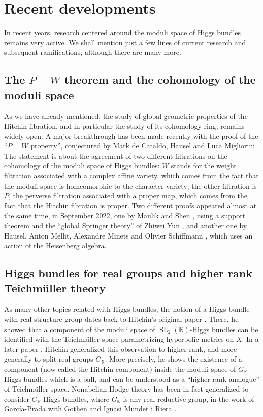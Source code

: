 \documentclass[12pt,a4paper]{amsbook}
\theoremstyle{remark} \newtheorem{rmk}[thm]{Remark}
\theoremstyle{definition} \newtheorem{defn}[thm]{Definition}
\theoremstyle{definition} \newtheorem{ex}[thm]{Example}
\theoremstyle{definition} \newtheorem{ej}{Exercise}
\newcommand{\bbR}{\mathbb R}
\DeclareMathOperator{\SL}{SL}
\begin{document}
\section{Recent developments}
In recent years, research centered around the moduli space of Higgs bundles remains very active. We shall mention just a few lines of current research and subsequent ramifications, although there are many more.

\subsection*{The $P=W$ theorem and the cohomology of the moduli space} As we have already mentioned, the study of global geometric properties of the Hitchin fibration, and in particular the study of its cohomology ring, remains widely open. A major breakthrough has been made recently with the proof of the ``$P=W$ property'', conjectured by Mark de Cataldo, Hausel and Luca Migliorini \cite{PWConjecture}. The statement is about the agreement of two different filtrations on the cohomology of the moduli space of Higgs bundles: $W$ stands for the weight filtration associated with a complex affine variety, which comes from the fact that the moduli space is homeomorphic to the character variety; the other filtration is $P$, the perverse filtration associated with a proper map, which comes from the fact that the Hitchin fibration is proper. Two different proofs appeared almost at the same time, in September 2022, one by Maulik and Shen \cite{MaulikShen_PW}, using a support theorem and the ``global Springer theory'' of Zhiwei Yun \cite{Yun}, and another one by Hausel, Anton Mellit, Alexandre Minets and Olivier Schiffmann \cite{H2_PW}, which uses an action of the Heisenberg algebra.

\subsection*{Higgs bundles for real groups and higher rank Teichmüller theory} As many other topics related with Higgs bundles, the notion of a Higgs bundle with real structure group dates back to Hitchin's original paper \cite{Hitchin_SelfDuality}. There, he showed that a component of the moduli space of $\SL_2(\bbR)$-Higgs bundles can be identified with the Teichmüller space parametrizing hyperbolic metrics on $X$. In a later paper \cite{Hitchin_Classes}, Hitchin generalized this observation to higher rank, and more generally to split real groups $G_\bbR$. More precisely, he shows the existence of a component (now called the Hitchin component) inside the moduli space of $G_\bbR$-Higgs bundles which is a ball, and can be understood as a ``higher rank analogue'' of Teichmüller space. Nonabelian Hodge theory has been in fact generalized to consider $G_\bbR$-Higgs bundles, where $G_\bbR$ is any real reductive group, in the work of García-Prada with Gothen and Ignasi Mundet i Riera \cite{OscarGothenMundet}.
\end{document}
